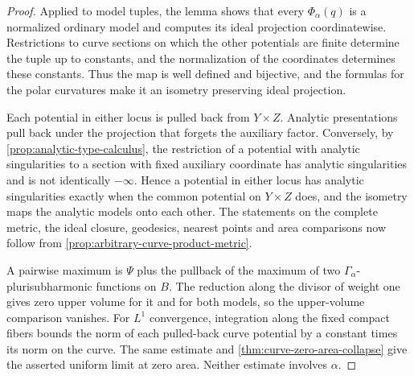 \begin{proof}
Applied to model tuples, the lemma shows that every $\Phi_\alpha(q)$ is a normalized ordinary model and computes its ideal projection coordinatewise. Restrictions to curve sections on which the other potentials are finite determine the tuple up to constants, and the normalization of the coordinates determines these constants. Thus the map is well defined and bijective, and the formulas for the polar curvatures make it an isometry preserving ideal projection.

Each potential in either locus is pulled back from $Y\times Z$. Analytic presentations pull back under the projection that forgets the auxiliary factor. Conversely, by \cref{prop:analytic-type-calculus}, the restriction of a potential with analytic singularities to a section with fixed auxiliary coordinate has analytic singularities and is not identically $-\infty$. Hence a potential in either locus has analytic singularities exactly when the common potential on $Y\times Z$ does, and the isometry maps the analytic models onto each other. The statements on the complete metric, the ideal closure, geodesics, nearest points and area comparisons now follow from \cref{prop:arbitrary-curve-product-metric}.

A pairwise maximum is $\Psi$ plus the pullback of the maximum of two $\Gamma_\alpha$-plurisubharmonic functions on $B$. The reduction along the divisor of weight one gives zero upper volume for it and for both models, so the upper-volume comparison vanishes. For $L^1$ convergence, integration along the fixed compact fibers bounds the norm of each pulled-back curve potential by a constant times its norm on the curve. The same estimate and \cref{thm:curve-zero-area-collapse} give the asserted uniform limit at zero area. Neither estimate involves $\alpha$.
\end{proof}

